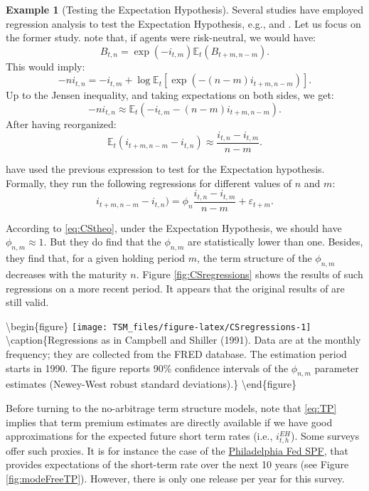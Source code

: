 \documentclass[
  12pt,
]{book}
\theoremstyle{definition}
\theoremstyle{definition}
\newtheorem{example}{Example}[chapter]
\theoremstyle{definition}
\theoremstyle{definition}
\theoremstyle{remark}
\begin{document}
\begin{example}[Testing the Expectation Hypothesis]
\protect\hypertarget{exm:TestingEH}{}\label{exm:TestingEH}Several studies have employed regression analysis to test the Expectation Hypothesis, e.g., \citet{Campbell_Shiller_1991} and \citet{Cochrane_Piazzesi_2005}. Let us focus on the former study. \citet{Campbell_Shiller_1991} note that, if agents were risk-neutral, we would have:
\[
B_{t,n} = \exp(-i_{t,m})\mathbb{E}_t(B_{t+m,n-m}).
\]
This would imply:
\[
-n i_{t,n} = -i_{t,m} + \log \mathbb{E}_t[\exp(-(n-m) i_{t+m,n-m})].
\]
Up to the Jensen inequality, and taking expectations on both sides, we get:
\[
-n i_{t,n} \approx \mathbb{E}_t(-i_{t,m} -(n-m) i_{t+m,n-m}).
\]
After having reorganized:
\begin{equation}
\mathbb{E}_t(i_{t+m,n-m}-i_{t,n}) \approx \frac{i_{t,n}-i_{t,m}}{n-m}.\label{eq:CStheo}
\end{equation}

\citet{Campbell_Shiller_1991} have used the previous expression to test for the Expectation hypothesis. Formally, they run the following regressions for different values of \(n\) and \(m\):
\[
i_{t+m,n-m}-i_{t,n}) = \phi_n\frac{i_{t,n}-i_{t,m}}{n-m} + \varepsilon_{t+m}.
\]

According to \eqref{eq:CStheo}, under the Expectation Hypothesis, we should have \(\phi_{n,m} \approx 1\). But they do find that the \(\phi_{n,m}\) are statistically lower than one. Besides, they find that, for a given holding period \(m\), the term structure of the \(\phi_{n,m}\) decreases with the maturity \(n\). Figure \ref{fig:CSregressions} shows the results of such regressions on a more recent period. It appears that the original results of \citet{Campbell_Shiller_1991} are still valid.

\textbackslash begin\{figure\}
\texttt{[image: TSM\_files/figure-latex/CSregressions-1]} \textbackslash caption\{Regressions as in Campbell and Shiller (1991). Data are at the monthly frequency; they are collected from the FRED database. The estimation period starts in 1990. The figure reports 90\% confidence intervals of the \(\phi_{n,m}\) parameter estimates (Newey-West robust standard deviations).\}\label{fig:CSregressions}
\textbackslash end\{figure\}
\end{example}

Before turning to the no-arbitrage term structure models, note that \eqref{eq:TP} implies that term premium estimates are directly available if we have good approximations for the expected future short term rates (i.e., \(i_{t,h}^{EH}\)). Some surveys offer such proxies. It is for instance the case of the \href{https://www.philadelphiafed.org/surveys-and-data/bill10}{Philadelphia Fed SPF}, that provides expectations of the short-term rate over the next 10 years (see Figure \ref{fig:modeFreeTP}). However, there is only one release per year for this survey.
\end{document}
